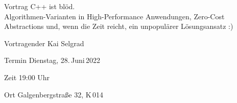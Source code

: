 \documentclass[department=FakIM,parskip=half]{OTHR_Placard}
\begin{document}
\begin{placard}

\begin{psection}{Vortrag}
\huge C++ ist blöd.\\[.5ex] \scriptsize Algorithmen-Varianten in High-Performance Anwendungen,  Zero-Cost Abstractions und, wenn die Zeit reicht, ein unpopulärer  Lösungsansatz :)
\end{psection}

\begin{psection}{Vortragender}
\vspace*{1ex}
{\huge Kai Selgrad}
\end{psection}

\begin{psection}{Termin}
\huge Dienstag, 28.\,Juni\,2022
\end{psection}

\begin{psection}{Zeit}
\LARGE 19:00 Uhr
\end{psection}

\begin{psection}{Ort}
\LARGE Galgenbergstraße 32, K\,014
\end{psection}


%
%  
%

\end{placard}
\end{document}
